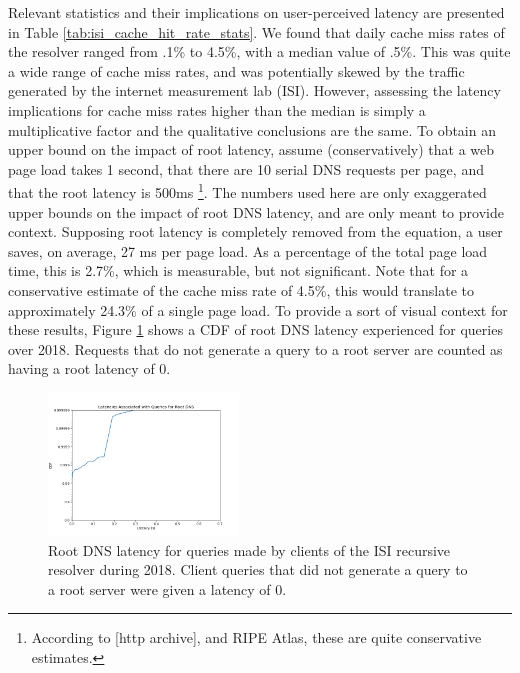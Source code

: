 \documentclass[sigconf,nonacm,10pt]{acmart}
\begin{document}
Relevant statistics and their implications on user-perceived latency are
presented in Table \ref{tab:isi_cache_hit_rate_stats}. We found that
daily cache miss rates of the resolver ranged from .1\% to 4.5\%, with a
median value of .5\%. This was quite a wide range of cache miss rates,
and was potentially skewed by the traffic generated by the internet
measurement lab (ISI). However, assessing the latency implications for
cache miss rates higher than the median is simply a multiplicative
factor and the qualitative conclusions are the same. To obtain an upper
bound on the impact of root latency, assume (conservatively) that a web
page load takes 1 second, that there are 10 serial DNS requests per
page, and that the root latency is 500ms
\footnote{ According to [http archive], and RIPE Atlas, these are quite conservative estimates. }.
The numbers used here are only exaggerated upper bounds on the impact of
root DNS latency, and are only meant to provide context. Supposing root
latency is completely removed from the equation, a user saves, on
average, 27 ms per page load. As a percentage of the total page load
time, this is 2.7\%, which is measurable, but not significant. Note that
for a conservative estimate of the cache miss rate of 4.5\%, this would
translate to approximately 24.3\% of a single page load. To provide a
sort of visual context for these results, Figure
\ref{fig:isi_root_dns_latency} shows a CDF of root DNS latency
experienced for queries over 2018. Requests that do not generate a query
to a root server are counted as having a root latency of 0.

\begin{figure}
    \centering
    \includegraphics[width=0.45\textwidth]{figures/isi_root_dns_latency.png}
    \caption{Root DNS latency for queries made by clients of the ISI recursive resolver during 2018. Client queries that did not generate a query to a root server were given a latency of 0. }
    \label{fig:isi_root_dns_latency}
\end{figure}
\end{document}
